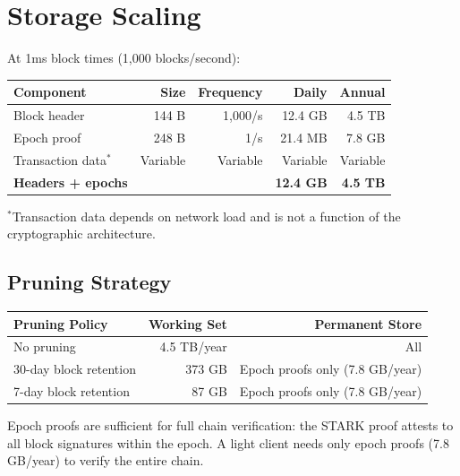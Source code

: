\section{Storage Scaling}


At 1ms block times (1,000 blocks/second):

\begin{center}
\begin{tabular}{lrrrr}
\toprule
\textbf{Component} & \textbf{Size} & \textbf{Frequency} & \textbf{Daily} & \textbf{Annual} \\
\midrule
Block header & 144 B & 1,000/s & 12.4 GB & 4.5 TB \\
Epoch proof & 248 B & 1/s & 21.4 MB & 7.8 GB \\
Transaction data$^*$ & Variable & Variable & Variable & Variable \\
\midrule
\textbf{Headers + epochs} & & & \textbf{12.4 GB} & \textbf{4.5 TB} \\
\bottomrule
\end{tabular}
\end{center}

$^*$Transaction data depends on network load and is not a function of the cryptographic architecture.

\subsection{Pruning Strategy}

\begin{center}
\begin{tabular}{lrr}
\toprule
\textbf{Pruning Policy} & \textbf{Working Set} & \textbf{Permanent Store} \\
\midrule
No pruning & 4.5 TB/year & All \\
30-day block retention & 373 GB & Epoch proofs only (7.8 GB/year) \\
7-day block retention & 87 GB & Epoch proofs only (7.8 GB/year) \\
\bottomrule
\end{tabular}
\end{center}

Epoch proofs are sufficient for full chain verification: the STARK proof attests to all block signatures within the epoch. A light client needs only epoch proofs (7.8 GB/year) to verify the entire chain.

